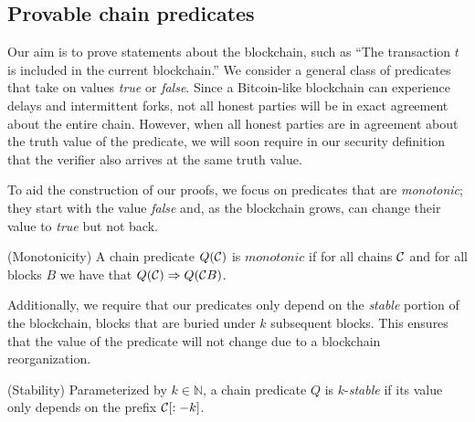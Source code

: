 \subsection{Provable chain predicates}

Our aim is to prove statements about the blockchain, such as ``The transaction
$t$ is included in the current blockchain.'' We consider a general class of
predicates that take on values \emph{true} or \emph{false}.  Since a
Bitcoin-like blockchain can experience delays and intermittent forks, not all
honest parties will be in exact agreement about the entire chain. However, when
all honest parties are in agreement about the truth value of the predicate, we
will soon require in our security definition that the verifier also arrives at
the same truth value.

To aid the construction of our proofs, we focus on predicates that are
\emph{monotonic}; they start with the value \emph{false} and, as the blockchain
grows, can change their value to \emph{true} but not back.

\begin{definition}{(Monotonicity)}
    A chain predicate $Q(\mathcal{C})$ is $\textit{monotonic}$ if for all chains
    $\mathcal{C}$ and for all blocks $B$ we have that
    $Q(\mathcal{C}) \Rightarrow Q(\mathcal{C} B)$.
\end{definition}

Additionally, we require that our predicates only depend on the \emph{stable}
portion of the blockchain, blocks that are buried under $k$ subsequent blocks.
This ensures that the value of the predicate will not change due to a blockchain
reorganization.

\begin{definition}{(Stability)}
    Parameterized by $k \in \mathbb{N}$, a chain predicate $Q$ is
    $k$-\emph{stable} if its value only depends on the prefix $\mathcal{C}[:-k]$.
\end{definition}
%

